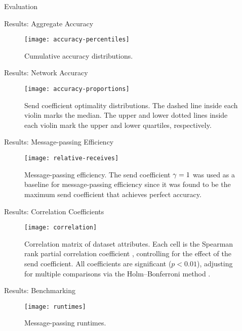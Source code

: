 \documentclass[11pt]{beamer}
\begin{document}
\begin{section}{Evaluation}

\begin{frame}{Results: Aggregate Accuracy}
\begin{figure}
  \centering
  \texttt{[image: accuracy-percentiles]}
  \caption[Cumulative accuracy distributions]{Cumulative accuracy distributions.}
\end{figure}
\end{frame}

\begin{frame}{Results: Network Accuracy}
\begin{figure}
  \centering
  \texttt{[image: accuracy-proportions]}
  \caption[Send coefficient optimality distributions]{Send coefficient optimality distributions. The dashed line inside each violin marks the median. The upper and lower dotted lines inside each violin mark the upper and lower quartiles, respectively.}
\end{figure}
\end{frame}

\begin{frame}{Results: Message-passing Efficiency}
\begin{figure}
  \centering
  \texttt{[image: relative-receives]}
  \caption[Message-passing efficiency]{Message-passing efficiency. The send coefficient $\gamma = 1$ was used as a baseline for message-passing efficiency since it was found to be the maximum send coefficient that achieves perfect accuracy.}
\end{figure}
\end{frame}

\begin{frame}{Results: Correlation Coefficients}
\begin{figure}
  \centering
  \texttt{[image: correlation]}
  \caption[Correlation matrix of dataset attributes]{Correlation matrix of dataset attributes. Each cell is the Spearman rank partial correlation coefficient \citep{Spearman1904}, controlling for the effect of the send coefficient. All coefficients are significant ($p < 0.01$), adjusting for multiple comparisons via the Holm–Bonferroni method \citep{Holm1979}.}
\end{figure}
\end{frame}

\begin{frame}{Results: Benchmarking}
\begin{figure}
  \centering
  \texttt{[image: runtimes]}
  \caption[Message-passing runtimes]{Message-passing runtimes.}
\end{figure}
\end{frame}


\end{section}
\end{document}
